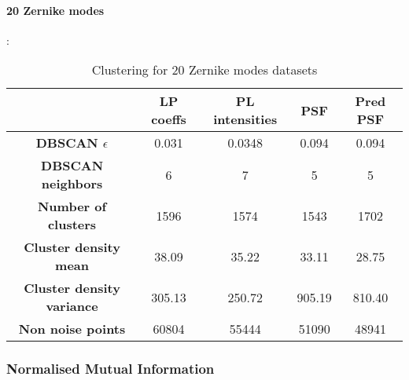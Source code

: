 		\paragraph{20 Zernike modes}:
		\begin{table}[h!]
			\centering
			\begin{tabular}{|c|c|c|c|c|}
				\hline
				\textbf{} & \textbf{LP coeffs} & \textbf{PL intensities} & \textbf{PSF} & \textbf{Pred PSF}\\
				\hline
				\textbf{DBSCAN $\epsilon$} & 0.031 & 0.0348 & 0.094 & 0.094\\
				\hline
				\textbf{DBSCAN neighbors} & 6 & 7 & 5 & 5\\
				\hline
				\textbf{Number of clusters} & 1596 & 1574 & 1543 & 1702\\
				\hline
				\textbf{Cluster density mean} & 38.09 & 35.22 & 33.11 & 28.75\\
				\hline
				\textbf{Cluster density variance} & 305.13 & 250.72 & 905.19 & 810.40\\
				\hline
				\textbf{Non noise points} & 60804 & 55444 & 51090 & 48941\\
				\hline
			\end{tabular}
		\caption{Clustering for 20 Zernike modes datasets}
		\end{table}
		\FloatBarrier
		
		
	\subsubsection{Normalised Mutual Information}
		
